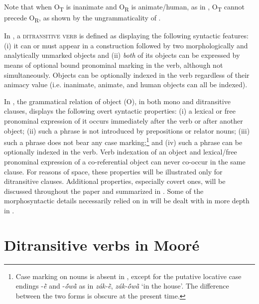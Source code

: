 \documentclass[output=paper]{langsci/langscibook}
\begin{document}
Note that when O\textsubscript{T} is inanimate and O\textsubscript{R} is animate/human, as in , O\textsubscript{T} cannot precede O\textsubscript{R}, as shown by the ungrammaticality of .

\z

In , a \textsc{ditransitive verb} is defined as displaying the following syntactic features: (i) it can or must appear in a construction followed by two morphologically and analytically unmarked objects and (ii) \textit{both} of its objects can be expressed by means of optional bound pronominal marking in the verb, although not simultaneously. Objects can be optionally indexed in the verb regardless of their animacy value (i.e. inanimate, animate, and human objects can all be indexed).

In , the grammatical relation of object (O), in both mono and ditransitive clauses, displays the following overt syntactic properties: (i) a lexical or free pronominal expression of it occurs immediately after the verb or after another object; (ii) such a phrase is not introduced by prepositions or relator nouns; (iii) such a phrase does not bear any case marking;\footnote{Case marking on nouns is absent in , except for the putative locative case endings -\textit{\`{ẽ}} and -\textit{\'{õ}w\`{ã}} as in \textit{zák-\`{ẽ}}, \textit{zák-\'{õ}w\`{ã}} `in the house'. The difference between the two forms is obscure at the present time.} and (iv) such a phrase can be optionally indexed in the verb. Verb indexation of an object and lexical/free pronominal expression of a co-referential object can never co-occur in the same clause. For reasons of space, these properties will be illustrated only for ditransitive clauses. Additional properties, especially covert ones, will be discussed throughout the paper and summarized in . Some of the morphosyntactic details necessarily relied on in   will be dealt with in more depth in .

\section{Ditransitive verbs in Mooré}\label{§3:ditransitive.pacchiarotti}
\end{document}
